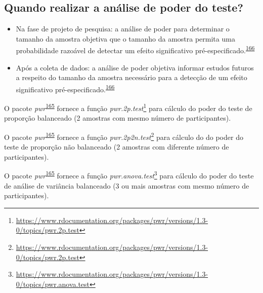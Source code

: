 \documentclass[
  a4paper,
]{book}
\renewcommand{\href}[2]{#2\footnote{\url{#1}}}
\newenvironment{infobox}[1]
  {
  \begin{itemize}
  \renewcommand{\labelitemi}{
    \raisebox{-.7\height}[0pt][0pt]{
      {\setkeys{Gin}{width=3em,keepaspectratio}
        \texttt{[image: \#1]}}
    }
  }
  \setlength{\fboxsep}{1em}
  \begin{blackbox}
  \item
  }
  {
  \end{blackbox}
  \end{itemize}
  }
\begin{document}
\hypertarget{quando-realizar-a-anuxe1lise-de-poder-do-teste}{%
\subsection{Quando realizar a análise de poder do teste?}\label{quando-realizar-a-anuxe1lise-de-poder-do-teste}}

\begin{itemize}
\item
  Na fase de projeto de pesquisa: a análise de poder para determinar o tamanho da amostra objetiva que o tamanho da amostra permita uma probabilidade razoável de detectar um efeito significativo pré-especificado.\textsuperscript{\protect\hyperlink{ref-heckman2022}{166}}
\item
  Após a coleta de dados: a análise de poder objetiva informar estudos futuros a respeito do tamanho da amostra necessário para a detecção de um efeito significativo pré-especificado.\textsuperscript{\protect\hyperlink{ref-heckman2022}{166}}
\end{itemize}

\begin{infobox}{images/Rlogo}
O pacote \emph{pwr}\textsuperscript{\protect\hyperlink{ref-pwr}{165}} fornece a função \href{https://www.rdocumentation.org/packages/pwr/versions/1.3-0/topics/pwr.2p.test}{\emph{pwr.2p.test}} para cálculo do poder do teste de proporção balanceado (2 amostras com mesmo número de participantes).

\end{infobox}

\begin{infobox}{images/Rlogo}
O pacote \emph{pwr}\textsuperscript{\protect\hyperlink{ref-pwr}{165}} fornece a função \href{https://www.rdocumentation.org/packages/pwr/versions/1.3-0/topics/pwr.2p.test}{\emph{pwr.2p2n.test}} para cálculo do do poder do teste de proporção não balanceado (2 amostras com diferente número de participantes).

\end{infobox}

\begin{infobox}{images/Rlogo}
O pacote \emph{pwr}\textsuperscript{\protect\hyperlink{ref-pwr}{165}} fornece a função \href{https://www.rdocumentation.org/packages/pwr/versions/1.3-0/topics/pwr.anova.test}{\emph{pwr.anova.test}} para cálculo do poder do teste de análise de variância balanceado (3 ou mais amostras com mesmo número de participantes).

\end{infobox}
\end{document}

